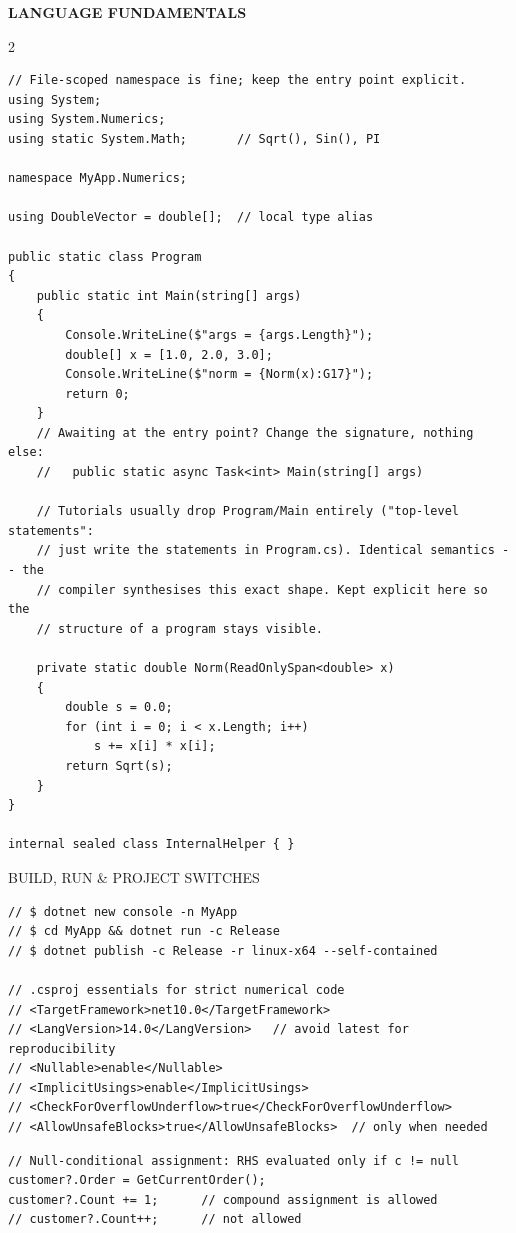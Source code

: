 \documentclass[9pt,a4paper]{extarticle}
\newenvironment{card}[3][acBlue]{%
  \begin{tcolorbox}[
    enhanced, colback=#2, colframe=bdCard,
    coltitle=black, colbacktitle=#2!70!bgHdr,
    fonttitle=\bfseries\fontsize{6.16pt}{7.48pt}\selectfont\MakeUppercase,
    title={#3},
    left=3pt, right=2pt, top=1.4pt, bottom=1.8pt,
    toptitle=1pt, bottomtitle=1pt,
    boxrule=0.4pt,
    borderline west={3pt}{0pt}{#1},
    arc=2pt, before skip=0pt, after skip=1.6mm,
    breakable, toprule at break=0pt, bottomrule at break=0pt,
  ]}{\end{tcolorbox}}
\newcommand{\sectionbanner}[1]{%
  \vspace{0.4mm}%
  {\setlength{\fboxsep}{1.5pt}%
   \colorbox{secBg}{\color{white}\bfseries\fontsize{6.6pt}{7.9pt}\selectfont
   \MakeUppercase{\hspace{0.5mm}#1\hspace{0.5mm}}}%
  }\vspace{1.3mm}\par\nobreak}
\newcommand{\sub}[1]{%
  \par\vspace{1.5pt}%
  {\fontsize{5.7pt}{7pt}\selectfont\color{gray}\MakeUppercase{#1}}\par
  \vspace{0.5pt}}
\begin{document}
\sectionbanner{Language Fundamentals}
\begin{multicols}{2}

\begin{card}[acBlue]{bgBlue}{Program Structure \& Namespaces}
\begin{lstlisting}[style=cs]
// File-scoped namespace is fine; keep the entry point explicit.
using System;
using System.Numerics;
using static System.Math;       // Sqrt(), Sin(), PI

namespace MyApp.Numerics;

using DoubleVector = double[];  // local type alias

public static class Program
{
    public static int Main(string[] args)
    {
        Console.WriteLine($"args = {args.Length}");
        double[] x = [1.0, 2.0, 3.0];
        Console.WriteLine($"norm = {Norm(x):G17}");
        return 0;
    }
    // Awaiting at the entry point? Change the signature, nothing else:
    //   public static async Task<int> Main(string[] args)

    // Tutorials usually drop Program/Main entirely ("top-level statements":
    // just write the statements in Program.cs). Identical semantics -- the
    // compiler synthesises this exact shape. Kept explicit here so the
    // structure of a program stays visible.

    private static double Norm(ReadOnlySpan<double> x)
    {
        double s = 0.0;
        for (int i = 0; i < x.Length; i++)
            s += x[i] * x[i];
        return Sqrt(s);
    }
}

internal sealed class InternalHelper { }
\end{lstlisting}
\sub{Build, Run \& Project Switches}
\begin{lstlisting}[style=cs]
// $ dotnet new console -n MyApp
// $ cd MyApp && dotnet run -c Release
// $ dotnet publish -c Release -r linux-x64 --self-contained

// .csproj essentials for strict numerical code
// <TargetFramework>net10.0</TargetFramework>
// <LangVersion>14.0</LangVersion>   // avoid latest for reproducibility
// <Nullable>enable</Nullable>
// <ImplicitUsings>enable</ImplicitUsings>
// <CheckForOverflowUnderflow>true</CheckForOverflowUnderflow>
// <AllowUnsafeBlocks>true</AllowUnsafeBlocks>  // only when needed
\end{lstlisting}
\end{card}

\begin{card}[acTeal]{bgTeal}{C\# 14 Essentials}
\begin{lstlisting}[style=cs]
// Null-conditional assignment: RHS evaluated only if c != null
customer?.Order = GetCurrentOrder();
customer?.Count += 1;      // compound assignment is allowed
// customer?.Count++;      // not allowed


\end{lstlisting}
\end{card}
\end{multicols}
\end{document}
